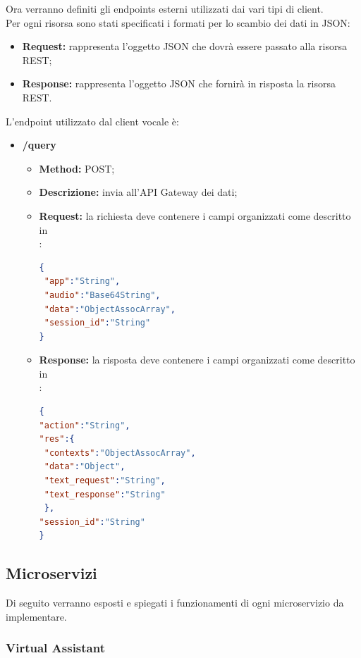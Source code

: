 	Ora verranno definiti gli endpoints esterni utilizzati dai vari tipi di client.\\
	Per ogni risorsa sono stati specificati i formati per lo scambio dei dati in JSON: 
	\begin{itemize}
		\item \textbf{Request:} rappresenta l’oggetto JSON che dovrà essere passato alla risorsa REST;
		\item \textbf{Response:} rappresenta l’oggetto JSON che fornirà in risposta la risorsa REST.
	\end{itemize}
	L'endpoint utilizzato dal client vocale è: 
	\begin{itemize}
		\item \textbf{/query}\\
		\begin{itemize}
			\item \textbf{Method:} POST;
			\item \textbf{Descrizione:} invia all'API Gateway dei dati;
			\item \textbf{Request:} la richiesta deve contenere i campi organizzati come descritto in \\:
\begin{lstlisting}[language=json,firstnumber=1]
{
 "app":"String",
 "audio":"Base64String",
 "data":"ObjectAssocArray",
 "session_id":"String"	
}
\end{lstlisting}
			\item \textbf{Response:} la risposta deve contenere i campi organizzati come descritto in \\:
\begin{lstlisting}[language=json,firstnumber=1] 
{
"action":"String",
"res":{
 "contexts":"ObjectAssocArray",
 "data":"Object",
 "text_request":"String",
 "text_response":"String"
 },
"session_id":"String"
}
\end{lstlisting}
		\end{itemize}
	\end{itemize}

\subsection{Microservizi}
Di seguito verranno esposti e spiegati i funzionamenti di ogni microservizio da implementare.
\subsubsection{Virtual Assistant}
